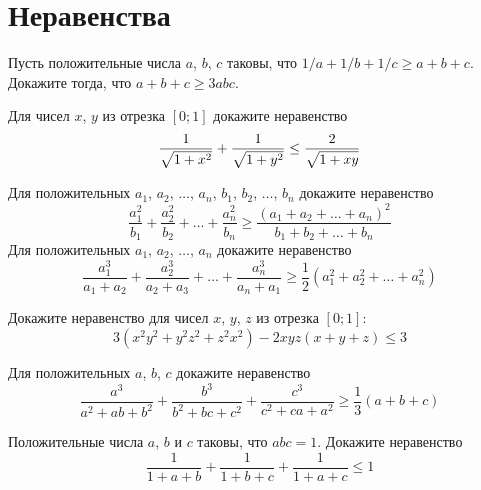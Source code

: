 

\section*{Неравенства}


\begin{problems}

\item
Пусть положительные числа $a$, $b$, $c$ таковы, что
$1/a + 1/b + 1/c \geq a + b + c$.
Докажите тогда, что $a + b + c \geq 3 a b c$.

\item
Для чисел $x$, $y$ из отрезка $[0; 1]$ докажите неравенство
\[
    \frac{1}{\sqrt{\mathstrut1 + x^2}}
    +
    \frac{1}{\sqrt{\mathstrut1 + y^2}}
\leq
    \frac{2}{\sqrt{\mathstrut1 + x y}}
\]
    
\item
\sbp
Для положительных $a_1$, $a_2$, $\ldots$, $a_n$, $b_1$, $b_2$, $\ldots$, $b_n$
докажите неравенство
\[
    \frac{a_1^2}{b_1} + \frac{a_2^2}{b_2} + \ldots + \frac{a_n^2}{b_n}
\geq
    \frac{(a_1 + a_2 + \ldots + a_n)^2}{b_1 + b_2 + \ldots + b_n}
\]
\sbp
Для положительных $a_1$, $a_2$, $\ldots$, $a_n$ докажите неравенство
\[
    \frac{a_1^3}{a_1 + a_2} + \frac{a_2^3}{a_2 + a_3}
    + \ldots +
    \frac{a_n^3}{a_n + a_1}
\geq
    \frac{1}{2}
    (a_1^2 + a_2^2 + \ldots + a_n^2)
\]

\item
Докажите неравенство для чисел $x$, $y$, $z$ из отрезка $[0; 1]$:
\[
    3 (x^2 y^2 + y^2 z^2 + z^2 x^2) - 2 x y z (x + y + z)
\leq
    3
\]

\item
Для положительных $a$, $b$, $c$ докажите неравенство
\[
    \frac{a^3}{a^2 + a b + b^2} +
    \frac{b^3}{b^2 + b c + c^2} +
    \frac{c^3}{c^2 + c a + a^2}
\geq
    \frac{1}{3}
    (a + b + c)
\]


\item
Положительные числа $a$, $b$ и $c$ таковы, что $a b c = 1$.
Докажите неравенство
\[
    \frac{1}{1 + a + b} + \frac{1}{1 + b + c} + \frac{1}{1 + a + c}
\leq
    1
\]
    

\end{problems}

